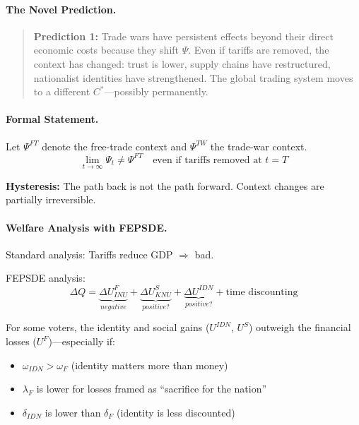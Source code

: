 \paragraph{The Novel Prediction.}
\begin{quote}
\textbf{Prediction 1:} Trade wars have persistent effects beyond their direct
economic costs because they shift $\Psi$. Even if tariffs are removed,
the context has changed: trust is lower, supply chains have restructured,
nationalist identities have strengthened. The global trading system
moves to a different $C^*$---possibly permanently.
\end{quote}

\paragraph{Formal Statement.}
Let $\Psi^{FT}$ denote the free-trade context and $\Psi^{TW}$ the trade-war context.
\begin{equation}
  \lim_{t \to \infty} \Psi_t \neq \Psi^{FT} \quad \text{even if tariffs removed at } t = T
\end{equation}

\textbf{Hysteresis:} The path back is not the path forward.
Context changes are partially irreversible.

\paragraph{Welfare Analysis with FEPSDE.}
Standard analysis: Tariffs reduce GDP $\Rightarrow$ bad.

FEPSDE analysis:
\begin{equation}
  \Delta Q = \underbrace{\Delta U^F_{INU}}_{negative} 
           + \underbrace{\Delta U^S_{KNU}}_{positive?} 
           + \underbrace{\Delta U^{IDN}}_{positive?}
           + \text{time discounting}
\end{equation}

For some voters, the identity and social gains ($U^{IDN}$, $U^S$)
outweigh the financial losses ($U^F$)---especially if:
\begin{itemize}
  \item $\omega_{IDN} > \omega_F$ (identity matters more than money)
  \item $\lambda_F$ is lower for losses framed as ``sacrifice for the nation''
  \item $\delta_{IDN}$ is lower than $\delta_F$ (identity is less discounted)
\end{itemize}

